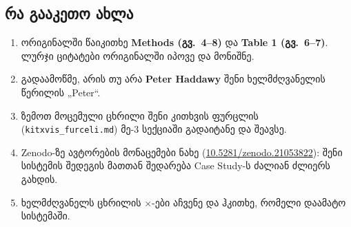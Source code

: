 \documentclass[11pt,a4paper]{article}
\begin{document}
\subsection*{რა გააკეთო ახლა}
\begin{enumerate}[leftmargin=1.5em]
  \item ორიგინალში წაიკითხე \textbf{Methods (გვ.~4--8)} და \textbf{Table 1 (გვ.~6--7)}. ლურჯი ციტატები ორიგინალში იპოვე და მონიშნე.
  \item გადაამოწმე, არის თუ არა \textbf{Peter Haddawy} შენი ხელმძღვანელის წერილის „Peter“.
  \item ზემოთ მოცემული ცხრილი შენი კითხვის ფურცლის (\texttt{kitxvis\_furceli.md}) მე-3 სექციაში გადაიტანე და შეავსე.
  \item Zenodo-ზე ავტორების მონაცემები ნახე (\href{https://doi.org/10.5281/zenodo.21053822}{10.5281/zenodo.21053822}): შენი სისტემის შედეგის მათთან შედარება Case Study-ს ძალიან ძლიერს გახდის.
  \item ხელმძღვანელს ცხრილის $\times$-ები აჩვენე და ჰკითხე, რომელი დაამატო სისტემაში.
\end{enumerate}
\end{document}
